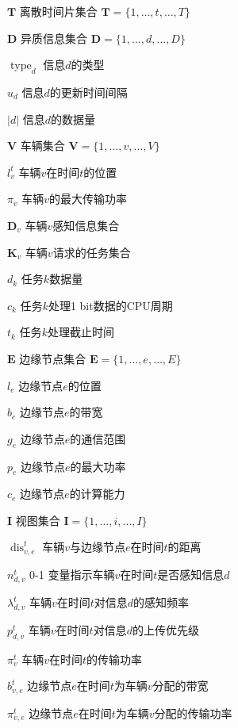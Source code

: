 \begin{denotation}[20mm][15mm]
	\item[$\mathbf{T}$] 离散时间片集合 $\mathbf{T}=\{1, \ldots, t, \ldots, T\}$
	\item[$\mathbf{D}$] 异质信息集合 $\mathbf{D}=\{1, \ldots, d, \ldots, D\}$
	\item[$\operatorname{type}_d$] 信息$d$的类型
	\item[$u_d$] 信息$d$的更新时间间隔
	\item[$\left|d\right|$] 信息$d$的数据量
	\item[$\mathbf{V}$] 车辆集合 $\mathbf{V}=\{1, \ldots, v, \ldots, V\}$
	\item[$l_{v}^{t}$] 车辆$v$在时间$t$的位置
	\item[$\pi_{v}$] 车辆$v$的最大传输功率
	\item[$\mathbf{D}_v$] 车辆$v$感知信息集合
	\item[$\mathbf{K}_{v}$] 车辆$v$请求的任务集合
	\item[$d_{k}$] 任务$k$数据量
	\item[$c_{k}$] 任务$k$处理1 bit数据的CPU周期
	\item[$t_{k}$] 任务$k$处理截止时间
	\item[$\mathbf{E}$] 边缘节点集合 $\mathbf{E}=\{1, \ldots, e, \ldots, E\}$
	\item[$l_{e}$] 边缘节点$e$的位置
	\item[$b_{e}$] 边缘节点$e$的带宽
	\item[$g_{e}$] 边缘节点$e$的通信范围
	\item[$p_{e}$] 边缘节点$e$的最大功率
	\item[$c_{e}$] 边缘节点$e$的计算能力
	\item[$\mathbf{I}$] 视图集合 $\mathbf{I}=\{1, \ldots, i, \ldots, I\}$
	\item[$\operatorname{dis}_{v, e}^{t}$] 车辆$v$与边缘节点$e$在时间$t$的距离
	\item[$n_{d, v}^t$] 0-1 变量指示车辆$v$在时间$t$是否感知信息$d$
	\item[$\lambda_{d, v}^{t}$] 车辆$v$在时间$t$对信息$d$的感知频率
	\item[$p_{d, v}^{t}$] 车辆$v$在时间$t$对信息$d$的上传优先级
	\item[$\pi_{v}^t$] 车辆$v$在时间$t$的传输功率
	\item[$b_{v, e}^{t}$] 边缘节点$e$在时间$t$为车辆$v$分配的带宽
	\item[$\pi_{v, e}^{t}$] 边缘节点$e$在时间$t$为车辆$v$分配的传输功率

\end{denotation}

